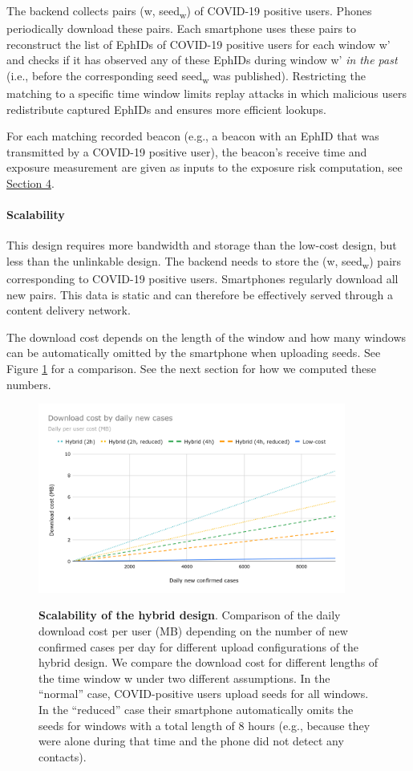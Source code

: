 \documentclass{article}
\begin{document}
The backend collects pairs (w, seed\textsubscript{w}) of COVID-19
positive users. Phones periodically download these pairs. Each
smartphone uses these pairs to reconstruct the list of EphIDs of
COVID-19 positive users for each window w' and checks if it has observed
any of these EphIDs during window w' \emph{in the past} (i.e., before
the corresponding seed seed\textsubscript{w} was published). Restricting
the matching to a specific time window limits replay attacks in which
malicious users redistribute captured EphIDs and ensures more efficient
lookups.

For each matching recorded beacon (e.g., a beacon with an EphID that was
transmitted by a COVID-19 positive user), the beacon's receive time and
exposure measurement are given as inputs to the exposure risk
computation, see \protect\hyperlink{exposure-estimation}{{Section 4}}.


\paragraph{Scalability}
This design requires more bandwidth and storage than the low-cost
design, but less than the unlinkable design. The backend needs to store
the (w, seed\textsubscript{w}) pairs corresponding to COVID-19 positive
users. Smartphones regularly download all new pairs. This data is static
and can therefore be effectively served through a content delivery
network.

The download cost depends on the length of the window and how many
windows can be automatically omitted by the smartphone when uploading
seeds. See Figure \ref{fig:scale_hybrid} for a comparison. See the next section for how we
computed these numbers.


\begin{figure}\centering
\includegraphics[width=0.9\textwidth]{figs/scalability_hybrid.png}
\label{fig:scale_hybrid}
\caption{\textbf{Scalability of the hybrid design}. Comparison of the
daily download cost per user (MB) depending on the number of new
confirmed cases per day for different upload configurations of the
hybrid design. We compare the download cost for different lengths of the
time window w under two different assumptions. In the ``normal'' case,
COVID-positive users upload seeds for all windows. In the ``reduced''
case their smartphone automatically omits the seeds for windows with a
total length of 8 hours (e.g., because they were alone during that time
and the phone did not detect any contacts).}
\end{figure}
\end{document}
